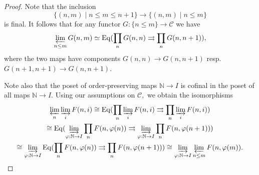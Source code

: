 \documentclass[11pt,leqno]{amsart}
\numberwithin{equation}{section}
\def\N{\mathbb{N}}
\newcommand{\indlim}[1][]{\mathop{\varinjlim}\limits_{#1}}
\newcommand{\prolim}[1][]{\mathop{\varprojlim}\limits_{#1}}
\newcommand{\prodd}[1][]{\mathop{\prod}\limits_{#1}}
\newcommand{\toto}{\rightrightarrows}
\newcommand{\cC}{{\mathcal C}}
\newcommand{\Eq}{\operatorname{Eq}}
\begin{document}
\begin{proof}Note that the inclusion
$$\{(n,m)\mid n\leq m\leq n+1\}\to \{(n,m)\mid n\leq m\}$$
is final. It follows that for any functor $G:\{n\leq m\}\to\cC$ we have
$$\prolim[n\leq m]G(n,m)\simeq\Eq(\prodd[n]G(n,n)\toto\prodd[n]G(n,n+1)),$$
where the two maps have components $G(n,n)\to G(n,n+1)$ resp. $G(n+1,n+1)\to G(n,n+1).$

Note also that the poset of order-preserving maps $\N\to I$ is cofinal in the poset of all maps $\N\to I.$ Using our assumptions on $\cC,$ we obtain the isomorphisms
\begin{multline*}\prolim[n]\indlim[i]F(n,i)\cong\Eq(\prodd[n]\indlim[i]F(n,i)\toto \prodd[n]\indlim[i]F(n,i))\\ \cong
 \Eq(\indlim[\varphi:\N\to I]\prodd[n]F(n,\varphi(n))\toto \indlim[\varphi:\N\to I]\prodd[n]F(n,\varphi(n+1)))\\ \cong \indlim[\varphi:\N\to I]\Eq(\prodd[n]F(n,\varphi(n))\toto \prodd[n]F(n,\varphi(n+1)))\cong \indlim[\varphi:\N\to I]\prolim[n\leq m]F(n,\varphi(m)).\qedhere\end{multline*}
\end{proof}
\end{document}
